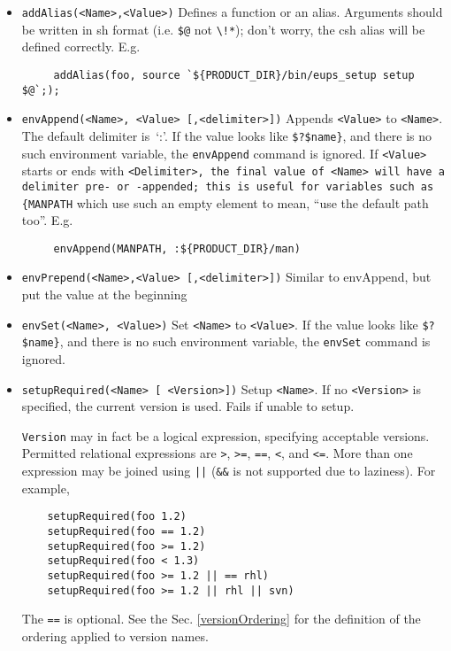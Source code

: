 \documentclass{article}
\newcommand{\code}[1]{\texttt{#1}}
\begin{document}
\begin{itemize}
   \item \code{addAlias(<Name>,<Value>)}
     Defines a function or an alias.  Arguments should be written in
     sh format (i.e. \code{\$@} not \code{\textbackslash!*}); don't worry,
     the csh alias will be defined correctly.  E.g.
     \begin{verbatim}
     addAlias(foo, source `${PRODUCT_DIR}/bin/eups_setup setup $@`;);
     \end{verbatim}
    
   \item \code{envAppend(<Name>, <Value> [,<delimiter>])}
     Appends \code{<Value>} to \code{<Name>}. The default delimiter is~`:'.
     If the value looks like \code{\$?\$name\}},
     and there is no such environment variable, the \code{envAppend} command is ignored.
     If \code{<Value>} starts or ends
     with \code{<Delimiter>, the final value of \code{<Name>} will
     have a delimiter pre- or -appended;  this is useful
     for variables such as \{MANPATH} which use such an empty
     element to mean, ``use the default path too''. E.g.
     \begin{verbatim}
     envAppend(MANPATH, :${PRODUCT_DIR}/man)
     \end{verbatim}		%
     
   \item \code{envPrepend(<Name>,<Value> [,<delimiter>])}
     Similar to envAppend, but put the value at the beginning
     
   \item \code{envSet(<Name>, <Value>)}
     Set \code{<Name>} to \code{<Value>}.
     If the value looks like \code{\$?\$name\}},
     and there is no such environment variable, the \code{envSet} command is ignored.
     
   \item \code{setupRequired(<Name> [ <Version>])}
     Setup \code{<Name>}.  If no \code{<Version>} is specified, the current
     version is used. Fails if unable to setup.

     \code{Version} may in fact be a logical expression, specifying acceptable
     versions. Permitted relational expressions are \code{>}, \code{>=}, \code{==},
     \code{<}, and \code{<=}. More than one expression may be joined using \code{||}
     (\code{\&\&} is not supported due to laziness).  For example,
\begin{verbatim}
    setupRequired(foo 1.2)
    setupRequired(foo == 1.2)
    setupRequired(foo >= 1.2)
    setupRequired(foo < 1.3)
    setupRequired(foo >= 1.2 || == rhl)
    setupRequired(foo >= 1.2 || rhl || svn)
\end{verbatim}
    The \code{==} is optional.  See the Sec. \ref{versionOrdering} for the definition
    of the ordering applied to version names.


\end{itemize}
\end{document}
